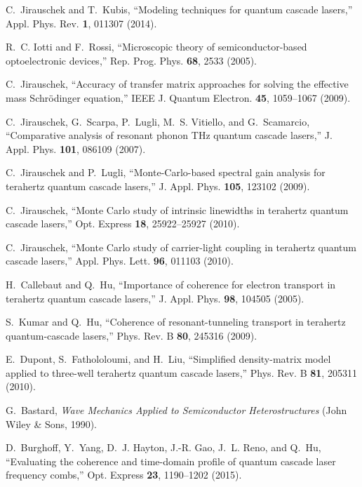 \documentclass[10pt]{article}
\begin{document}
\begin{thebibliography}{10}
	C.~Jirauschek and T.~Kubis, \enquote{Modeling techniques for quantum cascade
		lasers,} Appl. Phys. Rev. \textbf{1}, 011307 (2014).
	
	R.~C. Iotti and F.~Rossi, \enquote{Microscopic theory of semiconductor-based
		optoelectronic devices,} Rep. Prog. Phys. \textbf{68}, 2533 (2005).
	
	C.~{Jirauschek}, \enquote{{Accuracy of transfer matrix approaches for solving
			the effective mass Schr{\"o}dinger equation},} IEEE J. Quantum Electron.
	\textbf{45}, 1059--1067 (2009).
	
	C.~Jirauschek, G.~Scarpa, P.~Lugli, M.~S. Vitiello, and G.~Scamarcio,
	\enquote{{Comparative analysis of resonant phonon THz quantum cascade
			lasers},} J. Appl. Phys. \textbf{101}, 086109 (2007).
	
	C.~Jirauschek and P.~Lugli, \enquote{{Monte-Carlo-based spectral gain analysis
			for terahertz quantum cascade lasers},} J. Appl. Phys. \textbf{105}, 123102
	(2009).
	
	C.~Jirauschek, \enquote{{Monte Carlo study of intrinsic linewidths in terahertz
			quantum cascade lasers},} Opt. Express \textbf{18}, 25922--25927 (2010).
	
	C.~Jirauschek, \enquote{{Monte Carlo study of carrier-light coupling in
			terahertz quantum cascade lasers},} Appl. Phys. Lett. \textbf{96}, 011103
	(2010).
	
	H.~Callebaut and Q.~Hu, \enquote{Importance of coherence for electron transport
		in terahertz quantum cascade lasers,} J. Appl. Phys. \textbf{98}, 104505
	(2005).
	
	S.~Kumar and Q.~Hu, \enquote{Coherence of resonant-tunneling transport in
		terahertz quantum-cascade lasers,} Phys. Rev. B \textbf{80}, 245316 (2009).
	
	E.~Dupont, S.~Fathololoumi, and H.~Liu, \enquote{Simplified density-matrix
		model applied to three-well terahertz quantum cascade lasers,} Phys. Rev. B
	\textbf{81}, 205311 (2010).
	
	G.~Bastard, \emph{{Wave Mechanics Applied to Semiconductor Heterostructures}}
	(John Wiley \& Sons, 1990).
	
	D.~Burghoff, Y.~Yang, D.~J. Hayton, J.-R. Gao, J.~L. Reno, and Q.~Hu,
	\enquote{Evaluating the coherence and time-domain profile of quantum cascade
		laser frequency combs,} Opt. Express \textbf{23}, 1190--1202 (2015).
	

\end{thebibliography}
\end{document}
